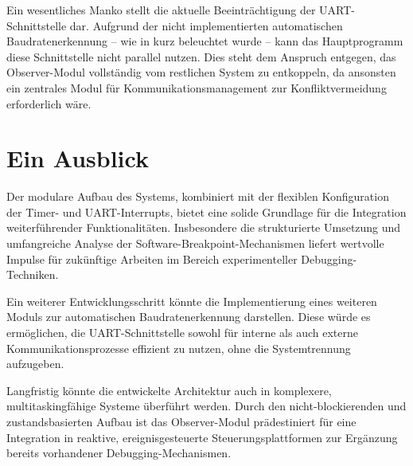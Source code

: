 \newpage
Ein wesentliches Manko stellt die aktuelle Beeintr\"achtigung der UART-Schnittstelle dar. Aufgrund der nicht implementierten automatischen Baudratenerkennung -- wie in  kurz beleuchtet wurde -- kann das Hauptprogramm diese Schnittstelle nicht parallel nutzen. Dies steht dem Anspruch entgegen, das Observer-Modul vollst\"andig vom restlichen System zu entkoppeln, da ansonsten ein zentrales Modul f\"ur Kommunikationsmanagement zur Konfliktvermeidung erforderlich w\"are.\AI


\section{Ein Ausblick}
\label{sec:EinAusblick}

Der modulare Aufbau des Systems, kombiniert mit der flexiblen Konfiguration der Timer- und UART-Interrupts, bietet eine solide Grundlage f\"ur die Integration weiterf\"uhrender Funktionalit\"aten. Insbesondere die strukturierte Umsetzung und umfangreiche Analyse der Software-Breakpoint-Mechanismen liefert wertvolle Impulse f\"ur zuk\"unftige Arbeiten im Bereich experimenteller Debugging-Techniken.

Ein weiterer Entwicklungsschritt k\"onnte die Implementierung eines weiteren Moduls zur automatischen Baudratenerkennung darstellen. Diese w\"urde es erm\"oglichen, die UART-Schnittstelle sowohl f\"ur interne als auch externe Kommunikationsprozesse effizient zu nutzen, ohne die Systemtrennung aufzugeben.

Langfristig k\"onnte die entwickelte Architektur auch in komplexere, multitaskingf\"ahige Systeme \"uberf\"uhrt werden. Durch den nicht-blockierenden und zustandsbasierten Aufbau ist das Observer-Modul pr\"adestiniert f\"ur eine Integration in reaktive, ereignisgesteuerte Steuerungsplattformen zur Erg\"anzung bereits vorhandener Debugging-Mechanismen.